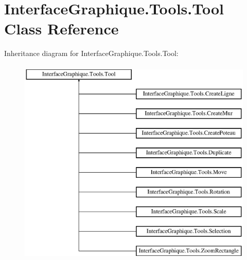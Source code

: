 \hypertarget{class_interface_graphique_1_1_tools_1_1_tool}{}\section{Interface\+Graphique.\+Tools.\+Tool Class Reference}
\label{class_interface_graphique_1_1_tools_1_1_tool}
Inheritance diagram for Interface\+Graphique.\+Tools.\+Tool\+:\begin{figure}[H]
\begin{center}
\leavevmode
\includegraphics[height=10.000000cm]{class_interface_graphique_1_1_tools_1_1_tool}
\end{center}
\end{figure}
